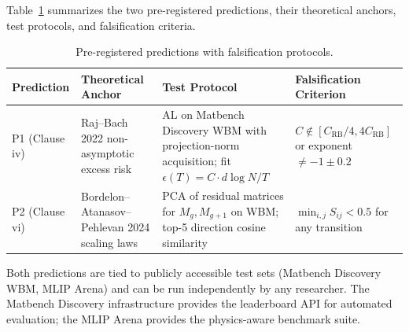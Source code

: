 Table~\ref{tab:pre-reg} summarizes the two pre-registered predictions, their theoretical anchors, test protocols, and falsification criteria.

\begin{table}[htbp]
\centering
\caption{Pre-registered predictions with falsification protocols.}
\label{tab:pre-reg}
\begin{tabular}{@{}p{2.2cm}p{3.8cm}p{4.5cm}p{3.5cm}@{}}
\toprule
\textbf{Prediction} & \textbf{Theoretical Anchor} & \textbf{Test Protocol} & \textbf{Falsification Criterion} \\
\midrule
P1 (Clause iv) & Raj--Bach 2022\cite{raj2022convergence} non-asymptotic excess risk & AL on Matbench Discovery WBM with projection-norm acquisition; fit $\epsilon(T) = C \cdot d \log N / T$ & $C \notin [C_{\text{RB}}/4, 4 C_{\text{RB}}]$ or exponent $\neq -1 \pm 0.2$ \\
\addlinespace
P2 (Clause vi) & Bordelon--Atanasov--Pehlevan 2024\cite{bordelon2024dynamical,bordelon2024feature} scaling laws & PCA of residual matrices for $M_g, M_{g+1}$ on WBM; top-5 direction cosine similarity & $\min_{i,j} S_{ij} < 0.5$ for any transition \\
\bottomrule
\end{tabular}
\end{table}

Both predictions are tied to publicly accessible test sets (Matbench Discovery WBM, MLIP Arena) and can be run independently by any researcher. The Matbench Discovery infrastructure\cite{riebesell2025matbench} provides the leaderboard API for automated evaluation; the MLIP Arena\cite{chiang2025mliparena} provides the physics-aware benchmark suite.
